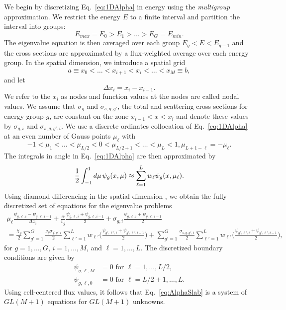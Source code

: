We begin by discretizing Eq.~\ref{eq:1DAlpha} in energy using the \textit{multigroup} approximation. We restrict the energy $E$ to a finite interval and partition the interval into groups:
\begin{equation}
	E_{max} = E_{0} > E_{1} > \dots > E_{G} = E_{min}.
\end{equation}
The eigenvalue equation is then averaged over each group $E_{g} < E < E_{g-1}$ and the cross sections are approximated by a flux-weighted average over each energy group. In the spatial dimension, we introduce a spatial grid
\begin{equation}
	a \equiv x_{0} < \dots < x_{i+1} < x_{i} < \dots < x_{M} \equiv b,
\end{equation}
and let 
\begin{equation}
\Delta x_{i} = x_{i} - x_{i-1}.
\end{equation} 
We refer to the $x_{i}$ as nodes and function values at the nodes are called nodal values. We assume that $\sigma_{g}$ and $\sigma_{s,g,g'}$, the total and scattering cross sections for energy group $g$, are constant on the zone $x_{i-1} < x < x_{i}$ and denote these values by $\sigma_{g,i}$ and $\sigma_{s,g,g',i}$. We use a discrete ordinates collocation of Eq.~\ref{eq:1DAlpha} at an even number of Gauss points $\mu_{\ell}$ with
\begin{equation}
	-1 < \mu_{1} < \dots < \mu_{L/2} < 0 < \mu_{L/2+1} < \dots < \mu_{L} < 1, \mu_{L+1-\ell} = - \mu_{\ell}.
\end{equation}
The integrals in angle in Eq.~\ref{eq:1DAlpha} are then approximated by
\begin{equation}
	\frac{1}{2} \int_{-1}^{1} \mathop{}\!d \mu \, \psi_{g}(x, \mu) \approx \sum_{\ell=1}^{L} w_{\ell} \psi_{g}(x, \mu_{\ell}).
\end{equation}
Using diamond differencing in the spatial dimension \cite{lewis_computational_1984}, we obtain the fully discretized set of equations for the eigenvalue problems
\begin{multline}
	\mu_{\ell} \frac{ \psi_{g,\ell,i} - \psi_{g, \ell, i-1}}{\Delta x_{i}} + \frac{\alpha}{v_{g}} \frac{\psi_{g,\ell,i} + \psi_{g, \ell, i-1}}{2} + \sigma_{g,i} \frac{\psi_{g,\ell,i} + \psi_{g, \ell, i-1}}{2} \\ = \frac{\chi_{g}}{2} \sum_{g'=1}^{G} \frac{\nu_{g}\sigma_{f,g',i}}{2} \sum_{\ell' = 1}^{L} w_{\ell'} \bigg ( \frac{\psi_{g',\ell',i} + \psi_{g',\ell',i-1} }{2} \bigg ) + \sum_{g'=1}^{G} \frac{\sigma_{s,g,g',i}}{2} \sum_{\ell' = 1}^{L} w_{\ell'} \bigg ( \frac{\psi_{g',\ell',i} + \psi_{g',\ell',i-1} }{2} \bigg ),
\label{eq:AlphaSlab}
\end{multline}
for $g = 1, \dots, G$, $i = 1, \dots, M$, and $\ell = 1, \dots, L$. The discretized boundary conditions are given by
\begin{align}
\psi_{g,\ell,M} &= 0 \text{ for } \ell = 1, \dots, L/2,  \\
\psi_{g,\ell,0} &= 0 \text{ for } \ell = L/2+1, \dots, L.
\end{align}
Using cell-centered flux values, it follows that Eq.~\ref{eq:AlphaSlab} is a system of $GL(M+1)$ equations for $GL(M+1)$ unknowns. 

